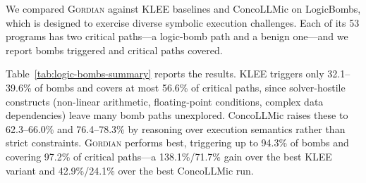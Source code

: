 \documentclass[acmsmall,screen,nonacm]{acmart}
\newcommand{\projName}{\textsc{Gordian}\xspace}
\theoremstyle{definition}
\begin{document}
We compared \projName{} against KLEE baselines and ConcoLLMic on LogicBombs, which is designed to exercise diverse symbolic execution challenges. Each of its 53 programs has two critical paths---a logic-bomb path and a benign one---and we report bombs triggered and critical paths covered.

Table~\ref{tab:logic-bombs-summary} reports the results. KLEE triggers only 32.1--39.6\% of bombs and covers at most 56.6\% of critical paths, since solver-hostile constructs (non-linear arithmetic, floating-point conditions, complex data dependencies) leave many bomb paths unexplored. ConcoLLMic raises these to 62.3--66.0\% and 76.4--78.3\% by reasoning over execution semantics rather than strict constraints. \projName{} performs best, triggering up to 94.3\% of bombs and covering 97.2\% of critical paths---a 138.1\%/71.7\% gain over the best KLEE variant and 42.9\%/24.1\% over the best ConcoLLMic run.




\end{document}
